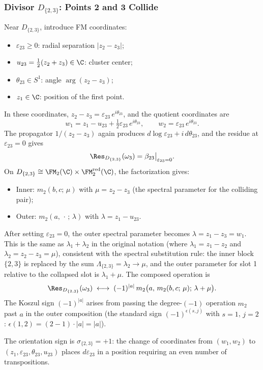 \subsubsection{Divisor $D_{\{2,3\}}$: Points 2 and 3 Collide}

\begin{computation}[$D_{\{2,3\}}$ residue]
\label{comp:D23}
Near $D_{\{2,3\}}$, introduce FM coordinates:
\begin{itemize}
\item $\varepsilon_{23} \geq 0$: radial separation $|z_2 - z_3|$;
\item $u_{23} = \tfrac{1}{2}(z_2 + z_3) \in \C$: cluster center;
\item $\theta_{23} \in S^1$: angle $\arg(z_2 - z_3)$;
\item $z_1 \in \C$: position of the first point.
\end{itemize}
In these coordinates, $z_2 - z_3 = \varepsilon_{23}\, e^{i\theta_{23}}$, and the quotient coordinates are
\[
w_1 = z_1 - u_{23} + \tfrac{1}{2}\varepsilon_{23}\, e^{i\theta_{23}}, \qquad
w_2 = \varepsilon_{23}\, e^{i\theta_{23}}.
\]
The propagator $1/(z_2 - z_3)$ again produces $d\log\varepsilon_{23} + i\, d\theta_{23}$, and the residue at $\varepsilon_{23} = 0$ gives
\[
\Res_{D_{\{2,3\}}}(\omega_3) = \beta_{23}\big|_{\varepsilon_{23}=0}.
\]
On $D_{\{2,3\}} \cong \FM_2(\C) \times \FM_2^{\mathrm{red}}(\C)$, the factorization gives:
\begin{itemize}
\item Inner: $m_2(b, c;\, \mu)$ with $\mu = z_2 - z_3$ (the spectral parameter for the colliding pair);
\item Outer: $m_2(a,\, \cdot\,;\, \lambda)$ with $\lambda = z_1 - u_{23}$.
\end{itemize}
After setting $\varepsilon_{23} = 0$, the outer spectral parameter becomes $\lambda = z_1 - z_3 = w_1$. This is the same as $\lambda_1 + \lambda_2$ in the original notation (where $\lambda_1 = z_1 - z_2$ and $\lambda_2 = z_2 - z_3 = \mu$), consistent with the spectral substitution rule: the inner block $\{2,3\}$ is replaced by the sum $\Lambda_{\{2,3\}} = \lambda_2 \to \mu$, and the outer parameter for slot 1 relative to the collapsed slot is $\lambda_1 + \mu$. The composed operation is
\[
\Res_{D_{\{2,3\}}}(\omega_3) \;\longleftrightarrow\; (-1)^{|a|}\, m_2\bigl(a,\, m_2(b,c;\,\mu);\, \lambda + \mu\bigr).
\]
The Koszul sign $(-1)^{|a|}$ arises from passing the degree-$(-1)$ operation $m_2$ past $a$ in the outer composition (the standard sign $(-1)^{\epsilon(s,j)}$ with $s=1$, $j=2$: $\epsilon(1,2) = (2-1)\cdot |a| = |a|$).

The orientation sign is $\sigma_{\{2,3\}} = +1$: the change of coordinates from $(w_1, w_2)$ to $(z_1, \varepsilon_{23}, \theta_{23}, u_{23})$ places $d\varepsilon_{23}$ in a position requiring an even number of transpositions.
\end{computation}

